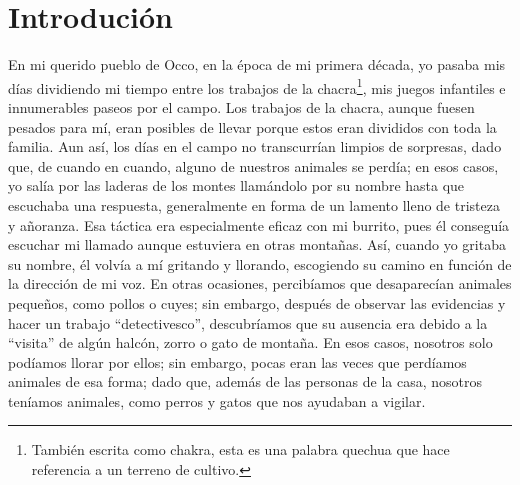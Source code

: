 \cleardoublepage
\newpage
\ifdefined\EnableIncludeImages
\fi
\chapter*{Introdución} %

En mi querido pueblo de Occo, en la época de mi primera década, yo pasaba mis días dividiendo mi tiempo entre los trabajos de la chacra\footnote{También escrita como chakra, esta es una palabra quechua que hace referencia a un terreno de cultivo.}, mis juegos infantiles e innumerables paseos por el campo.
Los trabajos de la chacra, aunque fuesen pesados para mí, eran posibles de llevar porque estos eran divididos con toda la familia. 
Aun así, los días en el campo no transcurrían limpios de sorpresas, dado que, de cuando en cuando, alguno de nuestros animales se perdía; en esos casos, yo salía por las laderas de los montes llamándolo por su nombre hasta que escuchaba una respuesta, generalmente en forma de un lamento lleno de tristeza y añoranza.
Esa táctica era especialmente eficaz con mi burrito, pues él conseguía escuchar mi llamado aunque estuviera en otras montañas. Así, cuando yo gritaba su nombre, él volvía a mí gritando y llorando, escogiendo su camino en función de la dirección de mi voz.  
En otras ocasiones, percibíamos que desaparecían animales pequeños, como pollos o cuyes; sin embargo, después de observar las evidencias y hacer un trabajo ``detectivesco'', descubríamos que su ausencia era debido a la ``visita'' de algún halcón, zorro o gato de montaña.
En esos casos, nosotros solo podíamos llorar por ellos; sin embargo, pocas eran las veces que perdíamos animales de esa forma; dado que, además de las personas de la casa, nosotros teníamos animales, como perros y gatos que nos ayudaban a vigilar.

